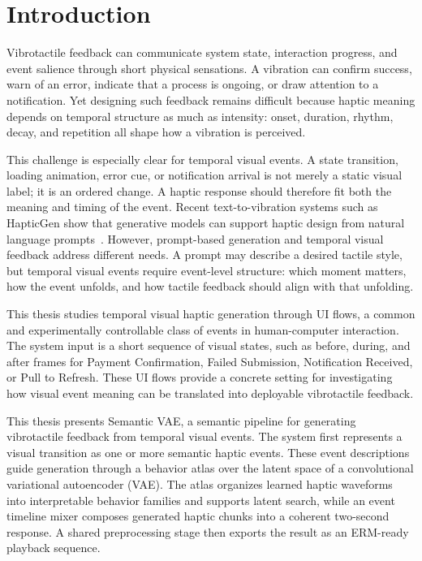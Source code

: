 \chapter{Introduction}

Vibrotactile feedback can communicate system state, interaction progress, and event salience through short physical sensations. A vibration can confirm success, warn of an error, indicate that a process is ongoing, or draw attention to a notification. Yet designing such feedback remains difficult because haptic meaning depends on temporal structure as much as intensity: onset, duration, rhythm, decay, and repetition all shape how a vibration is perceived.

This challenge is especially clear for temporal visual events. A state transition, loading animation, error cue, or notification arrival is not merely a static visual label; it is an ordered change. A haptic response should therefore fit both the meaning and timing of the event. Recent text-to-vibration systems such as HapticGen show that generative models can support haptic design from natural language prompts~\cite{sung2025hapticgen}. However, prompt-based generation and temporal visual feedback address different needs. A prompt may describe a desired tactile style, but temporal visual events require event-level structure: which moment matters, how the event unfolds, and how tactile feedback should align with that unfolding.

This thesis studies temporal visual haptic generation through UI flows, a common and experimentally controllable class of events in human-computer interaction. The system input is a short sequence of visual states, such as before, during, and after frames for Payment Confirmation, Failed Submission, Notification Received, or Pull to Refresh. These UI flows provide a concrete setting for investigating how visual event meaning can be translated into deployable vibrotactile feedback.

This thesis presents Semantic VAE, a semantic pipeline for generating vibrotactile feedback from temporal visual events. The system first represents a visual transition as one or more semantic haptic events. These event descriptions guide generation through a behavior atlas over the latent space of a convolutional variational autoencoder (VAE). The atlas organizes learned haptic waveforms into interpretable behavior families and supports latent search, while an event timeline mixer composes generated haptic chunks into a coherent two-second response. A shared preprocessing stage then exports the result as an ERM-ready playback sequence.


